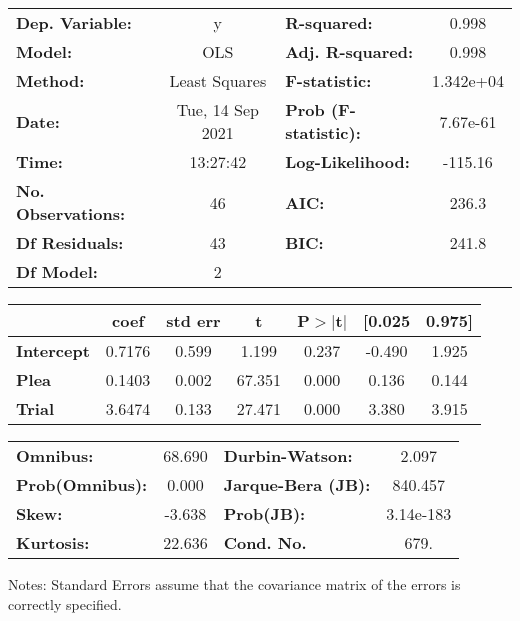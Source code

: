 \begin{center}
\begin{tabular}{lclc}
\toprule
\textbf{Dep. Variable:}    &        y         & \textbf{  R-squared:         } &     0.998   \\
\textbf{Model:}            &       OLS        & \textbf{  Adj. R-squared:    } &     0.998   \\
\textbf{Method:}           &  Least Squares   & \textbf{  F-statistic:       } & 1.342e+04   \\
\textbf{Date:}             & Tue, 14 Sep 2021 & \textbf{  Prob (F-statistic):} &  7.67e-61   \\
\textbf{Time:}             &     13:27:42     & \textbf{  Log-Likelihood:    } &   -115.16   \\
\textbf{No. Observations:} &          46      & \textbf{  AIC:               } &     236.3   \\
\textbf{Df Residuals:}     &          43      & \textbf{  BIC:               } &     241.8   \\
\textbf{Df Model:}         &           2      & \textbf{                     } &             \\
\bottomrule
\end{tabular}
\begin{tabular}{lcccccc}
                   & \textbf{coef} & \textbf{std err} & \textbf{t} & \textbf{P$> |$t$|$} & \textbf{[0.025} & \textbf{0.975]}  \\
\midrule
\textbf{Intercept} &       0.7176  &        0.599     &     1.199  &         0.237        &       -0.490    &        1.925     \\
\textbf{Plea}      &       0.1403  &        0.002     &    67.351  &         0.000        &        0.136    &        0.144     \\
\textbf{Trial}     &       3.6474  &        0.133     &    27.471  &         0.000        &        3.380    &        3.915     \\
\bottomrule
\end{tabular}
\begin{tabular}{lclc}
\textbf{Omnibus:}       & 68.690 & \textbf{  Durbin-Watson:     } &     2.097  \\
\textbf{Prob(Omnibus):} &  0.000 & \textbf{  Jarque-Bera (JB):  } &   840.457  \\
\textbf{Skew:}          & -3.638 & \textbf{  Prob(JB):          } & 3.14e-183  \\
\textbf{Kurtosis:}      & 22.636 & \textbf{  Cond. No.          } &      679.  \\
\bottomrule
\end{tabular}
\end{center}

Notes: \newline
 [1] Standard Errors assume that the covariance matrix of the errors is correctly specified.